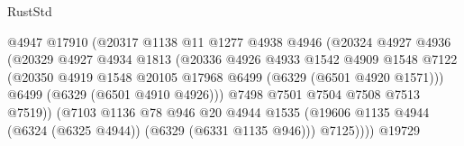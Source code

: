 \begin{lexlean}{RustStd}
\begin{coremodule}
{{                                      @4947
                                      @17910
                                      (@20317
                                        @1138
                                        @11
                                        @1277
                                        @4938
                                        @4946
                                        (@20324
                                          @4927
                                          @4936
                                          (@20329
                                            @4927
                                            @4934
                                            @1813
                                            (@20336
                                              @4926
                                              @4933
                                              @1542
                                              @4909
                                              @1548
                                              @7122
                                              (@20350
                                                @4919
                                                @1548
                                                @20105
                                                @17968
                                                @6499
                                                (@6329 (@6501 @4920 @1571)))
                                              @6499
                                              (@6329 (@6501 @4910 @4926)))
                                            @7498
                                            @7501
                                            @7504
                                            @7508
                                            @7513
                                            @7519))
                                        (@7103
                                          @1136
                                          @78
                                          @946
                                          @20
                                          @4944
                                          @1535
                                          (@19606
                                            @1135
                                            @4944
                                            (@6324 (@6325 @4944))
                                            (@6329 (@6331 @1135 @946)))
                                          @7125))))
                                  @19729
}}
\end{coremodule}
\end{lexlean}
